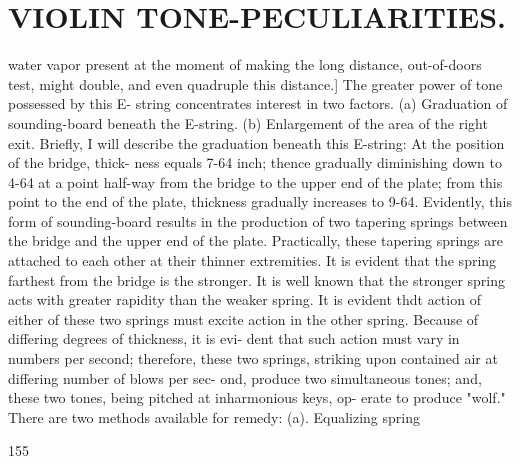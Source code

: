 \documentclass{article}
\begin{document}
\section*{VIOLIN TONE-PECULIARITIES.}
water vapor present at the moment of making the long distance, out-of-doors test, might double, and even quadruple this distance.] The greater power of tone possessed by this E- string concentrates interest in two factors. (a) Graduation of sounding-board beneath the E-string. (b) Enlargement of the area of the right exit. Briefly, I will describe the graduation beneath this E-string: At the position of the bridge, thick- ness equals 7-64 inch; thence gradually diminishing down to 4-64 at a point half-way from the bridge to the upper end of the plate; from this point to the end of the plate, thickness gradually increases to 9-64. Evidently, this form of sounding-board results in the production of two tapering springs between the bridge and the upper end of the plate. Practically, these tapering springs are attached to each other at their thinner extremities. It is evident that the spring farthest from the bridge is the stronger. It is well known that the stronger spring acts with greater rapidity than the weaker spring. It is evident thdt action of either of these two springs must excite action in the other spring. Because of differing degrees of thickness, it is evi- dent that such action must vary in numbers per second; therefore, these two springs, striking upon contained air at differing number of blows per sec- ond, produce two simultaneous tones; and, these two tones, being pitched at inharmonious keys, op- erate to produce "wolf." There are two methods available for remedy: (a). Equalizing spring

155
\end{document}

